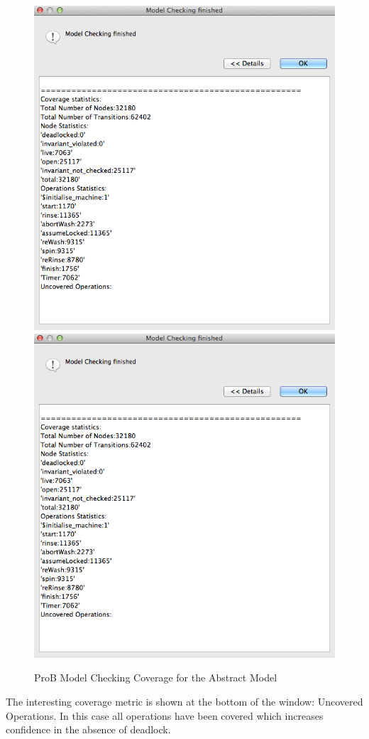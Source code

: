  \begin{figure}[!htbp]
  \centering
  \ifplastex
  \includegraphics[width=1024]{figures/image18.png}
  \else
  \includegraphics[width=1\textwidth]{figures/image18.png}
  \fi
  \caption{ProB Model Checking Coverage for the Abstract Model}
  \label{fig:ProBModelCheckingCoverageForTheAbstractModel}
\end{figure} 

The interesting coverage metric is shown at the bottom of the window: Uncovered Operations. In this case all operations have been covered which increases confidence in the absence of deadlock.


